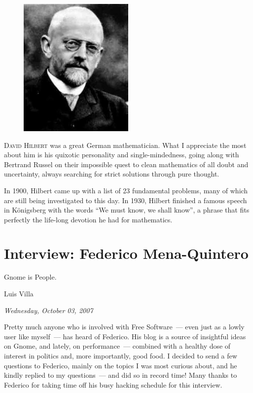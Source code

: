 \documentclass{book}
\begin{document}
\begin{figure}
\begin{center}
\includegraphics[width=0.50\textwidth]{hilbert}
\end{center}
\end{figure}

\lettrine{D}{avid Hilbert} was a great German mathematician. What I
appreciate the most about him is his quixotic personality and
single-mindedness, going along with Bertrand Russel on their
impossible quest to clean mathematics of all doubt and uncertainty,
always searching for strict solutions through pure thought.

In 1900, Hilbert came up with a list of 23 fundamental problems, many
of which are still being investigated to this day. In 1930, Hilbert
finished a famous speech in K{\"o}nigsberg with the words ``We must
know, we shall know'', a phrase that fits perfectly the life-long
devotion he had for mathematics.

\chapter{Interview: Federico Mena-Quintero}

\epigraph{Gnome is People.}{Luis Villa}

\begin{flushright}
  \emph{Wednesday, October 03, 2007}
\end{flushright}

Pretty much anyone who is involved with Free Software~--- even just as
a lowly user like myself~--- has heard of Federico. His blog is a
source of insightful ideas on Gnome, and lately, on performance~---
combined with a healthy dose of interest in politics and, more
importantly, good food. I decided to send a few questions to Federico,
mainly on the topics I was most curious about, and he kindly replied
to my questions~--- and did so in record time! Many thanks to Federico
for taking time off his busy hacking schedule for this interview.
\end{document}
